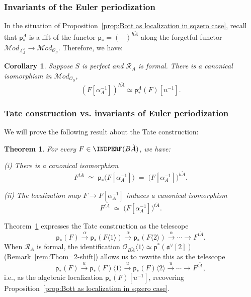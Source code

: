 \documentclass[12pt, oneside]{amsart}
\numberwithin{equation}{section}
\newtheorem{theorem}[subsubsection]{Theorem}
\newtheorem{corollary}[subsubsection]{Corollary}
\theoremstyle{remark}
\theoremstyle{plain}
\newcommand{\MOD}{\mathcal{M}\textit{od}}
\newcommand{\R}{\mathcal{R}}
\newcommand{\RA}{\R_A}
\newcommand{\frav}{\mathfrak{a}^\vee}
\newcommand{\lamco}{\Lambda^\vee}
\newcommand{\OO}{\mathcal{O}}
\newcommand{\Thom}[1]{\langle #1 \rangle}
\newcommand{\sfp}{\mathsf{p}}
\begin{document}
\subsubsection{Invariants of the Euler periodization}

In the situation of Proposition~\ref{prop:Bott as localization in sqzero case}, recall that $\sfp_*^{\Lambda}$ is a lift of the functor $\sfp_* = (-)^{h\check{A}}$ along the forgetful functor $\MOD_{\lamco_A} \to \MOD_{\OO_S}$.
Therefore, we have:

\begin{corollary}\label{cor:invariants of Bott vs beta inversion}
  Suppose $S$ is perfect and $\RA$ is formal.
  There is a canonical isomorphism in $\MOD_{\OO_S}$,
  \[
    (F[\alpha_A^{-1}])^{h\check{A}} \simeq \sfp_*^{\Lambda}(F)[u^{-1}].
  \]
\end{corollary}

\subsubsection{Tate construction vs. invariants of Euler periodization}

We will prove the following result about the Tate construction:

\begin{theorem}\label{thm:Tate vs invariants of Bott}
  For every $F \in \INDPERF(B\check{A})$, we have:

  {\rm(i)} There is a canonical isomorphism
  \[
    F^{t\check{A}}
    \;\simeq\;
    \sfp_*\bigl( F[\alpha_A^{-1}] \bigr)
    \;=\;
    \bigl( F[\alpha_A^{-1}] \bigr)^{h\check{A}}.
  \]

  {\rm(ii)} The localization map $F \to F[\alpha_A^{-1}]$ induces a canonical isomorphism
  \[
    F^{t\check{A}}
    \;\simeq\;
    \bigl( F[\alpha_A^{-1}] \bigr)^{t\check{A}}.
  \]
\end{theorem}

Theorem~\ref{thm:Tate vs invariants of Bott} expresses the Tate construction as the telescope
\[
  \sfp_*(F)
  \xrightarrow{\alpha} \sfp_*(F\Thom{1})
  \xrightarrow{\alpha} \sfp_*(F\Thom{2})
  \xrightarrow{\alpha} \cdots
  \longrightarrow F^{t\check{A}}.
\]
When $\RA$ is formal, the identification $\OO_{B\check{A}}\Thom{1} \simeq \sfp^*(\frav[2])$ (Remark~\ref{rem:Thom=2-shift}) allows us to rewrite this as the telescope
\[
  \sfp_*(F)
  \xrightarrow{u} \sfp_*(F)\Thom{1}
  \xrightarrow{u} \sfp_*(F)\Thom{2}
  \xrightarrow{u} \cdots
  \longrightarrow F^{t\check{A}},
\]
i.e., as the algebraic localization $\sfp_*(F)[u^{-1}]$, recovering Proposition~\ref{prop:Bott as localization in sqzero case}.
\end{document}
